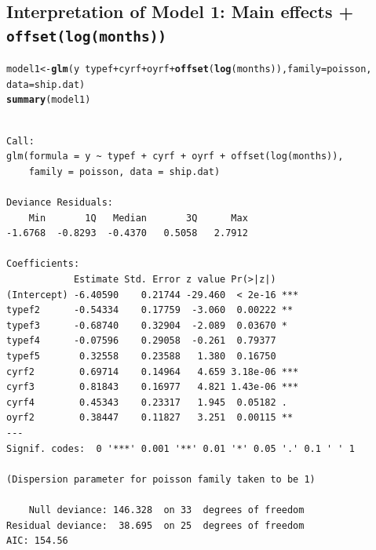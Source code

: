 \documentclass[oneside]{book}\usepackage[]{graphicx}\usepackage[svgnames]{xcolor}
\makeatletter
\newcommand{\hlopt}[1]{\textcolor[rgb]{0,0,0}{#1}}%
\newcommand{\hlstd}[1]{\textcolor[rgb]{0.345,0.345,0.345}{#1}}%
\newcommand{\hlkwb}[1]{\textcolor[rgb]{0.69,0.353,0.396}{#1}}%
\newcommand{\hlkwc}[1]{\textcolor[rgb]{0.333,0.667,0.333}{#1}}%
\newcommand{\hlkwd}[1]{\textcolor[rgb]{0.737,0.353,0.396}{\textbf{#1}}}%
\newenvironment{kframe}{%
 \def\at@end@of@kframe{}%
 \ifinner\ifhmode%
  \def\at@end@of@kframe{\end{minipage}}%
  \begin{minipage}{\columnwidth}%
 \fi\fi%
 \def\FrameCommand##1{\hskip\@totalleftmargin \hskip-\fboxsep
 \colorbox{shadecolor}{##1}\hskip-\fboxsep
     \hskip-\linewidth \hskip-\@totalleftmargin \hskip\columnwidth}%
 \MakeFramed {\advance\hsize-\width
   \@totalleftmargin\z@ \linewidth\hsize
   \@setminipage}}%
 {\par\unskip\endMakeFramed%
 \at@end@of@kframe}
\newenvironment{knitrout}{}{} %
\makeatother
\begin{document}
\subsection*{Interpretation of Model 1: Main effects + \texttt{offset(log(months))}}
\begin{knitrout}
\color{fgcolor}\begin{kframe}
\begin{alltt}
\hlstd{model1} \hlkwb{<-} \hlkwd{glm}\hlstd{(y} \hlopt{~} \hlstd{typef} \hlopt{+} \hlstd{cyrf} \hlopt{+} \hlstd{oyrf} \hlopt{+} \hlkwd{offset}\hlstd{(}\hlkwd{log}\hlstd{(months)),} \hlkwc{family} \hlstd{= poisson,}
  \hlkwc{data} \hlstd{= ship.dat)}
\hlkwd{summary}\hlstd{(model1)}
\end{alltt}
\begin{verbatim}

Call:
glm(formula = y ~ typef + cyrf + oyrf + offset(log(months)), 
    family = poisson, data = ship.dat)

Deviance Residuals: 
    Min       1Q   Median       3Q      Max  
-1.6768  -0.8293  -0.4370   0.5058   2.7912  

Coefficients:
            Estimate Std. Error z value Pr(>|z|)    
(Intercept) -6.40590    0.21744 -29.460  < 2e-16 ***
typef2      -0.54334    0.17759  -3.060  0.00222 ** 
typef3      -0.68740    0.32904  -2.089  0.03670 *  
typef4      -0.07596    0.29058  -0.261  0.79377    
typef5       0.32558    0.23588   1.380  0.16750    
cyrf2        0.69714    0.14964   4.659 3.18e-06 ***
cyrf3        0.81843    0.16977   4.821 1.43e-06 ***
cyrf4        0.45343    0.23317   1.945  0.05182 .  
oyrf2        0.38447    0.11827   3.251  0.00115 ** 
---
Signif. codes:  0 '***' 0.001 '**' 0.01 '*' 0.05 '.' 0.1 ' ' 1

(Dispersion parameter for poisson family taken to be 1)

    Null deviance: 146.328  on 33  degrees of freedom
Residual deviance:  38.695  on 25  degrees of freedom
AIC: 154.56


\end{verbatim}
\end{kframe}
\end{knitrout}
\end{document}
